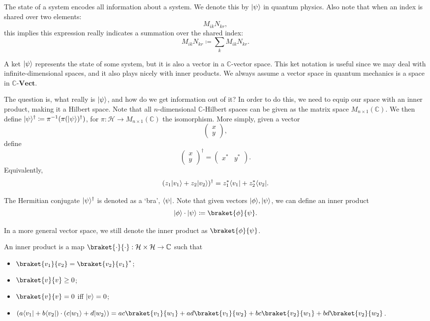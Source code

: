 The state of a system encodes all information about a system. We denote this by $\lvert\psi\rangle $ in quantum physics. Also note that when an index is shared over two elements:
\[
	M_{ik}N_{kr}
,\]
this implies this expression really indicates a summation over the shared index:
\[
	M_{ik}N_{kr}\coloneqq \sum_{k} M_{ik}N_{kr} 
.\]

A ket $ \lvert\psi\rangle $ represents the state of some system, but it is also a vector in a $\mathbb{C}$-vector space. This ket notation is useful since we may deal with infinite-dimensional spaces, and it also plays nicely with inner products. We always assume a vector space in quantum mechanics is a space in $\mathbb{C}\text{-}\mathbf{Vect}$.

The question is, what really is $ \lvert\psi\rangle $, and how do we get information out of it? In order to do this, we need to equip our space with an inner product, making it a Hilbert space. Note that all $n$-dimensional $\mathbb{C}$-Hilbert spaces can be given as the matrix space $M_{n\times 1}(\mathbb{C})$. We then define $ \lvert\psi\rangle ^\dagger \coloneqq \pi ^{-1}(\pi ( \lvert\psi\rangle) ^\dagger)$, for $\pi : \mathcal{H}  \to M_{n\times 1}(\mathbb{C})$ the isomorphism. More simply, given a vector
\[
	\begin{pmatrix}
		x\\
		y
	\end{pmatrix} 
,\]
define
\[
	\begin{pmatrix}
		x\\
		y
	\end{pmatrix}^\dagger = \begin{pmatrix}
	x^* & y^*
	\end{pmatrix} 
.\]
Equivalently,
\[
	(z_1 \lvert v_1\rangle + z_2 \lvert v_2\rangle )^\dagger=z_1^* \langle v_1\rvert +z_2^* \langle v_2\rvert 
.\]

 The Hermitian conjugate $ \lvert\psi \rangle^\dagger $ is denoted as a `bra', $ \langle\psi\rvert $. Note that given vectors $ \lvert\phi\rangle , \lvert\psi\rangle $, we can define an inner product
 \[
 	\ket{\phi} \cdot \ket{\psi} \coloneqq \braket{\phi }{\psi } 
 .\]
 
 In a more general vector space, we still denote the inner product as $\braket{\phi }{\psi } $.
 \begin{definition}\label{dfn:1.2}
 	An inner product is a map $\braket{\cdot }{\cdot } : \mathcal{H} \times \mathcal{H}  \to \mathbb{C}$ such that
	\begin{itemize}
		\item $\braket{v_1}{v_2} =\braket{v_2}{v_1} ^*$;
		\item $\braket{v}{v} \geq 0$;
		\item $\braket{v}{v} =0$ iff $ \lvert v\rangle =0$;
		\item $\left( a \bra{v_1} +b \bra{v_2}  \right) \cdot \left( c \ket{w_1} + d \ket{w_2}  \right) = ac \braket{v_1}{w_1} +ad \braket{v_1}{w_2} +bc \braket{v_2}{w_1} +bd \braket{v_2}{w_2} $.
	\end{itemize}
 \end{definition}

